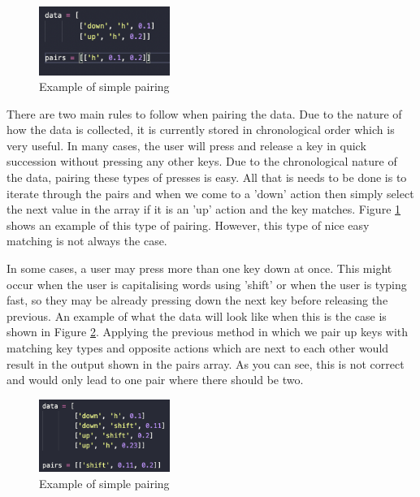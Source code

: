 \documentclass[10pt,a4paper]{report}
\begin{document}
\begin{figure}
	\begin{center}
		\includegraphics[width=0.38\textwidth]{SimplePairing}
	\end{center}
	\caption{Example of simple pairing}
	\label{fig:SimpPair}
\end{figure}

There are two main rules to follow when pairing the data. Due to the nature of how the data is collected, it is currently stored in chronological order which is very useful. In many cases, the user will press and release a key in quick succession without pressing any other keys. Due to the chronological nature of the data, pairing these types of presses is easy. All that is needs to be done is to iterate through the pairs and when we come to a 'down' action then simply select the next value in the array if it is an 'up' action and the key matches. Figure \ref{fig:SimpPair} shows an example of this type of pairing. However, this type of nice easy matching is not always the case.

In some cases, a user may press more than one key down at once. This might occur when the user is capitalising words using 'shift' or when the user is typing fast, so they may be already pressing down the next key before releasing the previous. An example of what the data will look like when this is the case is shown in Figure \ref{fig:WrongPair}. Applying the previous method in which we pair up keys with matching key types and opposite actions which are next to each other would result in the output shown in the pairs array. As you can see, this is not correct and would only lead to one pair where there should be two.

\begin{figure}
	\begin{center}
		\includegraphics[width=0.38\textwidth]{PairingWrong}
	\end{center}
	\caption{Example of simple pairing}
	\label{fig:WrongPair}
\end{figure}
\end{document}
